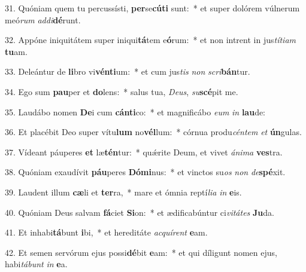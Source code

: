 31. Quóniam quem tu percussísti, \textbf{per}se\textbf{cú}\textbf{ti} sunt:~*  et super dolórem vúlnerum meó\textit{rum} \textit{ad}\textit{di}\textbf{dé}runt.\

32. Appóne iniquitátem super iniqui\textbf{tá}tem e\textbf{ó}rum:~*  et non intrent in jus\textit{tí}\textit{ti}\textit{am} \textbf{tu}am.\

33. Deleántur de \textbf{li}bro vi\textbf{vén}\textbf{ti}um:~*  et cum jus\textit{tis} \textit{non} \textit{scri}\textbf{bán}tur.\

34. Ego sum \textbf{pau}per et \textbf{do}lens:~*  salus tua, \textit{De}\textit{us}, \textit{su}\textbf{scé}pit me.\

35. Laudábo nomen \textbf{De}i cum \textbf{cán}\textbf{ti}co:~*  et magnificábo \textit{e}\textit{um} \textit{in} \textbf{lau}de:\

36. Et placébit Deo super vítu\textbf{lum} no\textbf{vél}lum:~*  córnua produ\textit{cén}\textit{tem} \textit{et} \textbf{ún}gulas.\

37. Vídeant páuperes \textbf{et} læ\textbf{tén}tur:~*  quǽrite Deum, et vivet \textit{á}\textit{ni}\textit{ma} \textbf{ves}tra.\

38. Quóniam exaudívit \textbf{páu}peres \textbf{Dó}\textbf{mi}nus:~*  et vinctos su\textit{os} \textit{non} \textit{de}\textbf{spé}xit.\

39. Laudent illum \textbf{cæ}li et \textbf{ter}ra,~*  mare et ómnia reptí\textit{li}\textit{a} \textit{in} \textbf{e}is.\

40. Quóniam Deus salvam \textbf{fá}ciet \textbf{Si}on:~*  et ædificabúntur ci\textit{vi}\textit{tá}\textit{tes} \textbf{Ju}da.\

41. Et inhabi\textbf{tá}bunt \textbf{i}bi,~*  et hereditáte \textit{ac}\textit{quí}\textit{rent} \textbf{e}am.\

42. Et semen servórum ejus possi\textbf{dé}bit \textbf{e}am:~*  et qui díligunt nomen ejus, habi\textit{tá}\textit{bunt} \textit{in} \textbf{e}a.\

